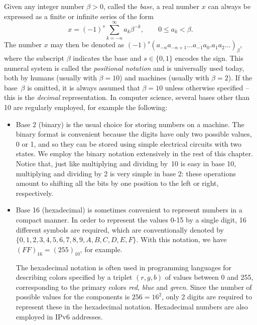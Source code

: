 Given any integer number $\beta > 0$, called the \emph{base},
a real number $x$ can always be expressed as a finite or infinite series of the form
\begin{equation}
    \label{eq:base_representation}
    x = (-1)^s \sum_{k=-n}^{\infty} a_k \beta^{-k}, \qquad 0 \leq a_k < \beta.
\end{equation}
The number $x$ may then be denoted as $(-1)^s (a_{-n} a_{-n+1}\dots a_{-1} a_{0}.a_{1} a_{2} \dots)_{\beta}$,
where the subscript $\beta$ indicates the base and $s \in \{0, 1\}$ encodes the sign.
This numeral system is called the \emph{positional notation} and is universally used today,
both by humans (usually with $\beta=10$) and machines (usually with $\beta=2$).
If the base~$\beta$ is omitted,
it is always assumed that $\beta = 10$ unless otherwise specified
-- this is the \emph{decimal} representation.
In computer science, several bases other than 10 are regularly employed,
for example the following:
\begin{itemize}
    \item
        Base 2 (binary) is the usual choice for storing numbers on a machine.
        The binary format is convenient because the digits have only two possible values, 0 or 1,
        and so they can be stored using simple electrical circuits with two states.
        We employ the binary notation extensively in the rest of this chapter.
        Notice that, just like multiplying and dividing by~10 is easy in base 10,
        multiplying and dividing by 2 is very simple in base 2:
        these operations amount to shifting all the bits by one position to the left or right,
        respectively.

    \item
        Base 16 (hexadecimal) is sometimes convenient to represent numbers in a compact manner.
        In order to represent the values 0-15 by a single digit,
        16 different symbols are required, which are conventionally denoted by $\{0,1,2,3,4,5,6,7,8,9,A,B,C,D,E,F\}$.
        With this notation, we have $(FF)_{16} = (255)_{10}$, for example.

        The hexadecimal notation is often used in programming languages for describing colors specified by a triplet $(r,g,b)$ of values between 0 and 255,
        corresponding to the primary colors \emph{red}, \emph{blue} and \emph{green}.
        Since the number of possible values for the components is $256 = 16^2$,
        only 2 digits are required to represent these in the hexadecimal notation.
        Hexadecimal numbers are also employed in IPv6 addresses.
\end{itemize}

